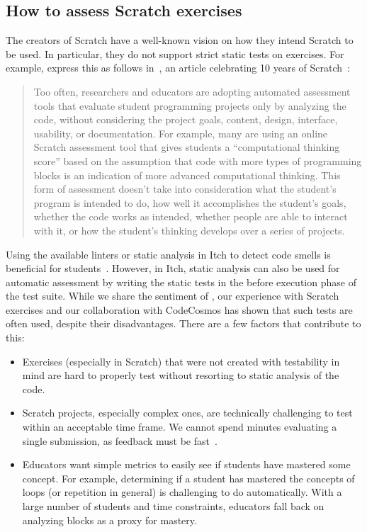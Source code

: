 \documentclass[../main]{subfiles}
\begin{document}
\subsection{How to assess Scratch exercises}\label{subsec:how-to-evaluate-scratch-exercises}

The creators of Scratch have a well-known vision on how they intend Scratch to be used.
In particular, they do not support strict static tests on exercises.
For example, \citeauthor{resnickCodingCrossroads2020} express this as follows in~, an article celebrating 10 years of Scratch~\autocite{resnickCodingCrossroads2020}:

\begin{quotation}
    Too often, researchers and educators are adopting automated assessment tools that evaluate student programming projects only by analyzing the code, without considering the project goals, content, design, interface, usability, or documentation.
    For example, many are using an online Scratch assessment tool that gives students a ``computational thinking score'' based on the assumption that code with more types of programming blocks is an indication of more advanced computational thinking.
    This form of assessment doesn't take into consideration what the student's program is intended to do, how well it accomplishes the student's goals, whether the code works as intended, whether people are able to interact with it, or how the student's thinking develops over a series of projects.
\end{quotation}

Using the available linters or static analysis in Itch to detect code smells is beneficial for students~\autocite{hermansCodeSmellsHamper2016}.
However, in Itch, static analysis can also be used for automatic assessment by writing the static tests in the before execution phase of the test suite.
While we share the sentiment of \citeauthor{resnickCodingCrossroads2020}, our experience with Scratch exercises and our collaboration with CodeCosmos has shown that such tests are often used, despite their disadvantages.
There are a few factors that contribute to this:

\begin{itemize}
    \item Exercises (especially in Scratch) that were not created with testability in mind are hard to properly test without resorting to static analysis of the code.
    \item Scratch projects, especially complex ones, are technically challenging to test within an acceptable time frame.
        We cannot spend minutes evaluating a single submission, as feedback must be fast~\autocite{sarsaSpeedingAutomatedAssessment2022}.
    \item Educators want simple metrics to easily see if students have mastered some concept.
          For example, determining if a student has mastered the concepts of loops (or repetition in general) is challenging to do automatically.
          With a large number of students and time constraints, educators fall back on analyzing blocks as a proxy for mastery.
\end{itemize}
\end{document}
